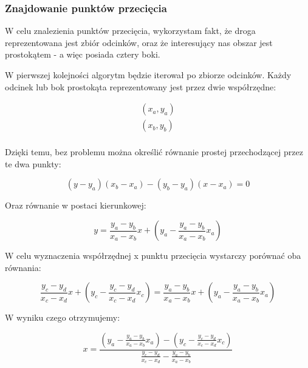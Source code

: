 \subsubsection{Znajdowanie punktów przecięcia}

W celu znalezienia punktów przecięcia, wykorzystam fakt, że droga reprezentowana jest zbiór odcinków, oraz że interesujący nas obszar jest prostokątem - a więc posiada cztery boki. 

W pierwszej kolejności algorytm będzie iterował po zbiorze odcinków. Każdy odcinek lub bok prostokąta reprezentowany jest przez dwie współrzędne: 

\begin{equation} \label{sec:powiekszoneWierzcholek}
\begin{split}
(x_a, y_a) \\
(x_b, y_b) \\
\end{split}
\end{equation}

Dzięki temu, bez problemu można określić równanie prostej przechodzącej przez te dwa punkty:

\begin{equation} \label{sec:powiekszoneWierzcholek}
(y - y_a) (x_b-x_a) - (y_b - y_a) (x - x_a) = 0
\end{equation}

Oraz równanie w postaci kierunkowej:

\begin{equation} \label{sec:prostaKierunkowa}
y=\frac{y_a - y_b}{x_a - x_b}x + (y_a - \frac{y_a - y_b}{x_a - x_b}x_a)
\end{equation}

W celu wyznaczenia współrzędnej x punktu przecięcia wystarczy porównać oba równania:

\begin{equation} \label{sec:powiekszoneWierzcholek}
\frac{y_c - y_d}{x_c - x_d}x + (y_c - \frac{y_c - y_d}{x_c - x_d}x_c)=\frac{y_a - y_b}{x_a - x_b}x + (y_a - \frac{y_a - y_b}{x_a - x_b}x_a)
\end{equation}

W wyniku czego otrzymujemy:

\begin{equation} \label{sec:powiekszoneWierzcholek}
x = \frac{(y_a - \frac{y_a - y_b}{x_a - x_b}x_a) - (y_c - \frac{y_c - y_d}{x_c - x_d}x_c)}{\frac{y_c - y_d}{x_c - x_d} - \frac{y_a - y_b}{x_a - x_b}}
\end{equation}

